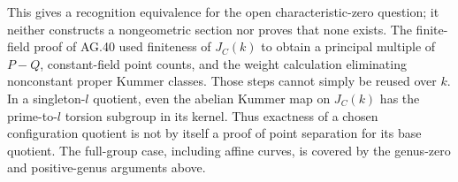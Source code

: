 This gives a recognition equivalence for the open characteristic-zero
question; it neither constructs a nongeometric section nor proves
that none exists. The finite-field proof of AG.40 used finiteness of
$J_C(k)$ to obtain a principal multiple of $P-Q$, constant-field point
counts, and the weight calculation eliminating nonconstant proper
Kummer classes. Those steps cannot simply be reused over $k$.
In a singleton-$l$ quotient, even the abelian Kummer map on $J_C(k)$
has the prime-to-$l$ torsion subgroup in its kernel. Thus exactness of
a chosen configuration quotient is not by itself a proof of point
separation for its base quotient. The full-group case, including
affine curves, is covered by the genus-zero and positive-genus
arguments above.\citep[\S1.2]{LA_CiperianiStix2015}

